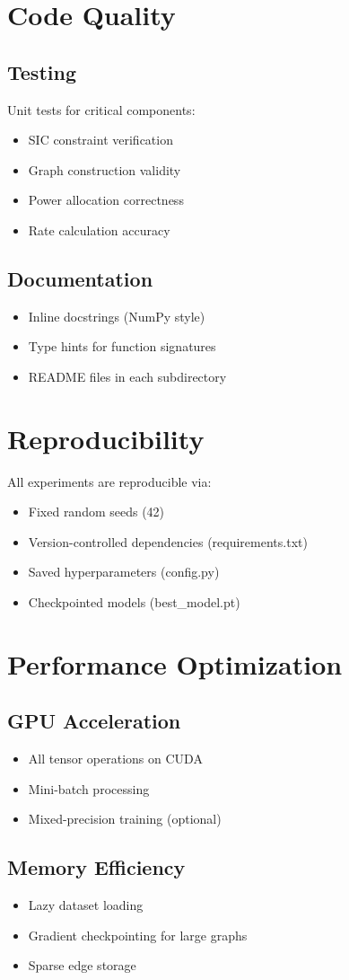 \section{Code Quality}

\subsection{Testing}
Unit tests for critical components:
\begin{itemize}
    \item SIC constraint verification
    \item Graph construction validity
    \item Power allocation correctness
    \item Rate calculation accuracy
\end{itemize}

\subsection{Documentation}
\begin{itemize}
    \item Inline docstrings (NumPy style)
    \item Type hints for function signatures
    \item README files in each subdirectory
\end{itemize}

\section{Reproducibility}

All experiments are reproducible via:
\begin{itemize}
    \item Fixed random seeds (42)
    \item Version-controlled dependencies (requirements.txt)
    \item Saved hyperparameters (config.py)
    \item Checkpointed models (best\_model.pt)
\end{itemize}

\section{Performance Optimization}

\subsection{GPU Acceleration}
\begin{itemize}
    \item All tensor operations on CUDA
    \item Mini-batch processing
    \item Mixed-precision training (optional)
\end{itemize}

\subsection{Memory Efficiency}
\begin{itemize}
    \item Lazy dataset loading
    \item Gradient checkpointing for large graphs
    \item Sparse edge storage
\end{itemize}
